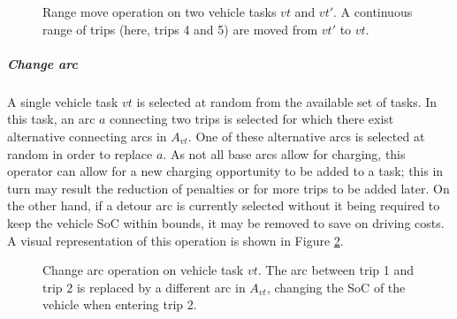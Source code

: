 \documentclass[]{article}
\begin{document}
\begin{figure}[H]
  \centering
  \caption{Range move operation on two vehicle tasks $vt$ and $vt'$. A continuous range of trips (here, trips 4 and 5) are moved from $vt'$ to $vt$.}
  \label{fig:rangemove-vt}
\end{figure}

\noindent\subparagraph{Change arc} A single vehicle task $vt$ is selected at random from the available set of tasks. In this task, an arc $a$ connecting two trips is selected for which there exist alternative connecting arcs in $A_{vt}$. One of these alternative arcs is selected at random in order to replace $a$. As not all base arcs allow for charging, this operator can allow for a new charging opportunity to be added to a task; this in turn may result the reduction of penalties or for more trips to be added later. On the other hand, if a detour arc is currently selected without it being required to keep the vehicle SoC within bounds, it may be removed to save on driving costs. A visual representation of this operation is shown in Figure \ref{fig:changearc-vt}.
\begin{figure}[h]
  \centering
  \caption{Change arc operation on vehicle task $vt$. The arc between trip 1 and trip 2 is replaced by a different arc in $A_{vt}$, changing the SoC of the vehicle when entering trip 2.}
  \label{fig:changearc-vt}
\end{figure}
\end{document}
